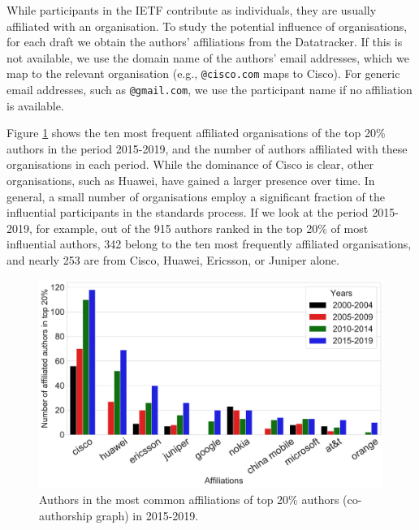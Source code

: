 \documentclass[twocolumn,10pt]{article}
\newlength{\figureWidthOneColumn}
\newcommand{\pb}[1]{\vspace{0.75ex}\noindent{\textbf{#1}}}
\begin{document}
\pb{Organisations}  While participants in the IETF contribute as
individuals, they are usually affiliated with an organisation.  To study
the potential influence of organisations, for each draft we obtain the
authors' affiliations from the Datatracker. If this is not available, we
use the domain name of the authors' email addresses, which we map to the
relevant organisation (e.g., \texttt{@cisco.com} maps to Cisco). For generic
email addresses, such as \texttt{@gmail.com}, we use the participant name
if no affiliation is available.

Figure \ref{fig:coauthor_affiliation_network2019_otheryears} shows the ten
most frequent affiliated organisations of the top 20\% authors in the
period 2015-2019, and the number of authors affiliated with these
organisations in  each  period.  While the dominance of Cisco is clear,
other organisations, such as Huawei, have gained a larger presence over
time.  In general, a small number of organisations employ a significant
fraction of the influential participants in the standards process. If we
look at the period 2015-2019, for example, out of the 915 authors ranked in
the top 20\% of most influential authors, 342 belong to the ten most
frequently affiliated organisations, and nearly 253 are from Cisco, Huawei,
Ericsson, or Juniper alone.

\begin{figure}
  \centering
  \includegraphics[width=\figureWidthOneColumn]{figures-prev/icwsm-2022/coauthor_affiliation_network/2019_affiliations_in_otheryears_coauthor_network.pdf}
  \caption{
    Authors in the most common affiliations of top 20\% authors
    (co-authorship graph) in 2015-2019.
  }
  \label{fig:coauthor_affiliation_network2019_otheryears}
\end{figure}
\end{document}
